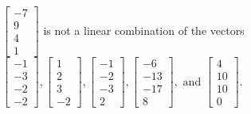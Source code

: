 \begin{exercise}
\begin{exerciseStatement}
  \end{exerciseStatement}
  \begin{exerciseAnswer}
   \(\left[\begin{array}{c}
-7 \\
9 \\
4 \\
1
\end{array}\right]\) 
  	 is not  
	a linear combination of the vectors \(\left[\begin{array}{c}
-1 \\
-3 \\
-2 \\
-2
\end{array}\right] , \left[\begin{array}{c}
1 \\
2 \\
3 \\
-2
\end{array}\right] , \left[\begin{array}{c}
-1 \\
-2 \\
-3 \\
2
\end{array}\right] , \left[\begin{array}{c}
-6 \\
-13 \\
-17 \\
8
\end{array}\right] , \text{ and } \left[\begin{array}{c}
4 \\
10 \\
10 \\
0
\end{array}\right]\).

	
  


  \end{exerciseAnswer}
\end{exercise}